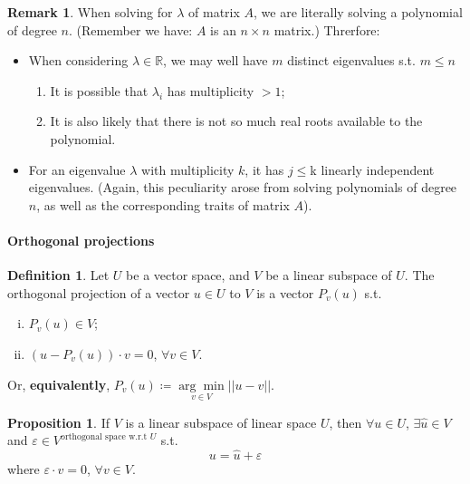 \documentclass[12pt]{article}
\newcommand{\R}{{\mathbb R}}
\theoremstyle{definition}
\newtheorem{definition}[theorem]{Definition}
\newtheorem{proposition}[theorem]{Proposition}
\newtheorem{remark}[theorem]{Remark}
\theoremstyle{plain}
\begin{document}
\begin{remark}
    When solving for $\lambda$ of matrix $A$, we are literally solving a polynomial of degree
    $n$. (Remember we have: $A$ is an $n \times n$ matrix.) Threrfore:
    \begin{itemize}
        \item When considering $\lambda \in \R$, we may well have $m$ distinct
            eigenvalues s.t. $m \le n$
            \begin{enumerate}
                \item It is possible that $\lambda _i$ has multiplicity $>1$;
                \item It is also likely that there is not so much real roots
                    available to the polynomial.
            \end{enumerate}
        \item For an eigenvalue $\lambda$ with multiplicity $k$, it has $j \le
            $k linearly independent eigenvalues. (Again, this peculiarity arose
                from solving polynomials of degree $n$, as well as the
            corresponding traits of matrix $A$).
    \end{itemize}
\end{remark}

\paragraph{Orthogonal projections}
\begin{definition}
    Let $U$ be a vector space, and $V$ be a linear subspace of $U$. The
    orthogonal projection of a vector $u \in  U$ to $V$ is a vector $P_v(u)$
    s.t.
    \begin{enumerate}[(i)]
        \item $P_v(u) \in V$;
        \item $(u - P_v(u))\cdot v = 0$, $\forall v \in V$.
    \end{enumerate}
    Or, \textbf{equivalently}, $P_v(u) \coloneqq \underset{v \in V} {\arg \min}
    ||u - v||$.
\end{definition}

\begin{proposition}
    If $V$ is a linear subspace of linear space $U$, then $\forall u \in U$,
    $\exists \hat u \in V$ and $\varepsilon \in V^{{\text{orthogonal space
    w.r.t }U}}$ s.t.
    \[
        u = \hat u + \varepsilon
    \]
    where $\varepsilon \cdot v = 0$, $\forall v \in V$.
\end{proposition}
\end{document}
